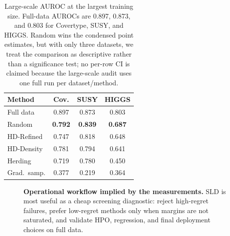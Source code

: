 \begin{table}[!t]
\centering
\caption{Large-scale AUROC at the largest training size. Full-data AUROCs are
0.897, 0.873, and 0.803 for Covertype, SUSY, and HIGGS. Random wins the
condensed point estimates, but with only three datasets, we treat the comparison
as descriptive rather than a significance test; no per-row CI is claimed because
the large-scale audit uses one full run per dataset/method.}
\label{tab:large-auroc}
\scriptsize
\setlength{\tabcolsep}{3pt}
\begin{tabular}{@{}lccc@{}}
\toprule
\textbf{Method} & \textbf{Cov.} & \textbf{SUSY} & \textbf{HIGGS} \\
\midrule
Full data & 0.897 & 0.873 & 0.803 \\
Random & \textbf{0.792} & \textbf{0.839} & \textbf{0.687} \\
HD-Refined & 0.747 & 0.818 & 0.648 \\
HD-Density & 0.781 & 0.794 & 0.641 \\
Herding & 0.719 & 0.780 & 0.450 \\
Grad.\ samp. & 0.377 & 0.219 & 0.364 \\
\bottomrule
\end{tabular}
\end{table}

\begin{figure}[!t]
\centering
{}
\caption{%
  \textbf{Operational workflow implied by the measurements.}
  SLD is most useful as a cheap screening diagnostic: reject high-regret
  failures, prefer low-regret methods only when margins are not saturated, and
  validate HPO, regression, and final deployment choices on full data.%
}
\label{fig:workflow}
\end{figure}

